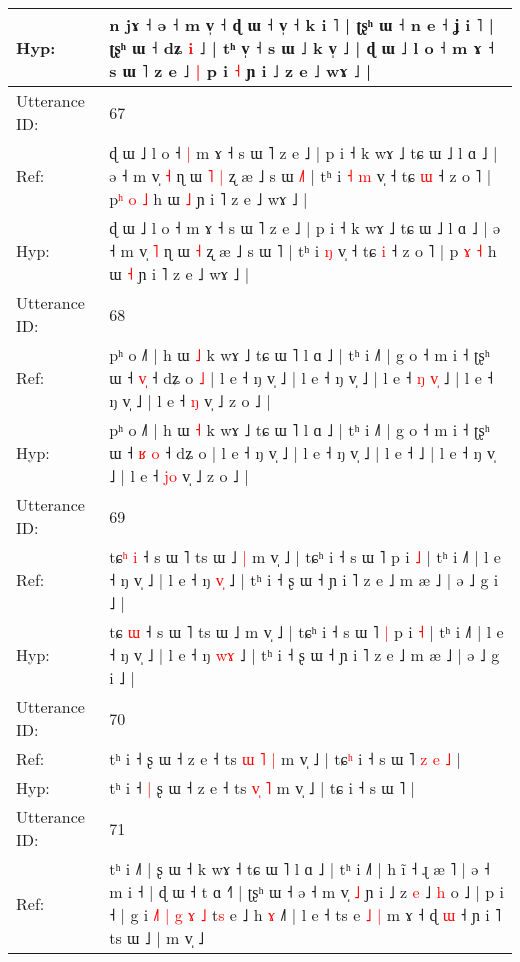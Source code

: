 \documentclass[10pt]{article}
\DeclareRobustCommand{\hl}[1]{{\textcolor{red}{#1}}}
\begin{document}
\begin{longtable}{ll}
 \\
Hyp: & n jɤ ˧\hl{}\hl{} ə ˧ m v̩ ˧\hl{}\hl{}\hl{} ɖ ɯ ˧ v̩ ˧ k i ˥ | ʈʂʰ ɯ ˧ n e ˧ ʝ i ˥ | ʈʂʰ ɯ ˧ dʑ \hl{i} ˩ | tʰ v̩ ˧ s ɯ ˩ k v̩ ˩ | ɖ ɯ ˩ l o ˧\hl{}\hl{} m ɤ ˧ s ɯ ˥ z e ˩\hl{ }\hl{|} p i \hl{˧} ɲ i ˩ z e ˩ wɤ ˩ |
 \\
\midrule
Utterance ID: & 67 \\
Ref: & ɖ ɯ ˩ l o ˧\hl{ }\hl{|} m ɤ ˧ s ɯ ˥ z e ˩ | p i ˧ k wɤ ˩ tɕ ɯ ˩ l ɑ ˩ | ə ˧ m v̩ \hl{˧} ɳ ɯ\hl{ }\hl{˥} \hl{|} ʐ æ ˩ s ɯ \hl{˩}˥ | tʰ i\hl{ }\hl{˧} \hl{m} v̩ ˧ tɕ \hl{ɯ} ˧ z o ˥ | p\hl{ʰ} \hl{o} \hl{˩} h ɯ \hl{˩} ɲ i ˥ z e ˩ wɤ ˩ |
 \\
Hyp: & ɖ ɯ ˩ l o ˧\hl{}\hl{} m ɤ ˧ s ɯ ˥ z e ˩ | p i ˧ k wɤ ˩ tɕ ɯ ˩ l ɑ ˩ | ə ˧ m v̩ \hl{˥} ɳ ɯ\hl{}\hl{} \hl{˧} ʐ æ ˩ s ɯ \hl{}˥ | tʰ i\hl{}\hl{} \hl{ŋ} v̩ ˧ tɕ \hl{i} ˧ z o ˥ | p\hl{} \hl{ɤ} \hl{˧} h ɯ \hl{˧} ɲ i ˥ z e ˩ wɤ ˩ |
 \\
\midrule
Utterance ID: & 68 \\
Ref: & pʰ o ˩˥ | h ɯ \hl{˩} k wɤ ˩ tɕ ɯ ˥ l ɑ ˩ | tʰ i ˩˥ | g o ˧ m i ˧ ʈʂʰ ɯ ˧ \hl{}\hl{v}\hl{̩} ˧ dʑ o\hl{ }\hl{˩} | l e ˧ ŋ v̩ ˩ | l e ˧ ŋ v̩ ˩ | l e ˧\hl{ }\hl{ŋ}\hl{ }\hl{v}\hl{̩} ˩ | l e ˧ ŋ v̩ ˩ | l e ˧ \hl{}\hl{ŋ} v̩ ˩ z o ˩ |
 \\
Hyp: & pʰ o ˩˥ | h ɯ \hl{˧} k wɤ ˩ tɕ ɯ ˥ l ɑ ˩ | tʰ i ˩˥ | g o ˧ m i ˧ ʈʂʰ ɯ ˧ \hl{ʁ}\hl{ }\hl{o} ˧ dʑ o\hl{}\hl{} | l e ˧ ŋ v̩ ˩ | l e ˧ ŋ v̩ ˩ | l e ˧\hl{}\hl{}\hl{}\hl{}\hl{} ˩ | l e ˧ ŋ v̩ ˩ | l e ˧ \hl{j}\hl{o} v̩ ˩ z o ˩ |
 \\
\midrule
Utterance ID: & 69 \\
Ref: & tɕ\hl{ʰ} \hl{i} ˧ s ɯ ˥ ts ɯ ˩\hl{ }\hl{|} m v̩ ˩ | tɕʰ i ˧ s ɯ ˥\hl{}\hl{} p i \hl{˩} | tʰ i ˩˥ | l e ˧ ŋ v̩ ˩ | l e ˧ ŋ \hl{v}\hl{̩} ˩ | tʰ i ˧ ʂ ɯ ˧ ɲ i ˥ z e ˩ m æ ˩ | ə ˩ g i ˩ |
 \\
Hyp: & tɕ\hl{} \hl{ɯ} ˧ s ɯ ˥ ts ɯ ˩\hl{}\hl{} m v̩ ˩ | tɕʰ i ˧ s ɯ ˥\hl{ }\hl{|} p i \hl{˧} | tʰ i ˩˥ | l e ˧ ŋ v̩ ˩ | l e ˧ ŋ \hl{w}\hl{ɤ} ˩ | tʰ i ˧ ʂ ɯ ˧ ɲ i ˥ z e ˩ m æ ˩ | ə ˩ g i ˩ |
 \\
\midrule
Utterance ID: & 70 \\
Ref: & tʰ i ˧\hl{}\hl{} ʂ ɯ ˧ z e ˧ ts \hl{ɯ}\hl{ }\hl{˥} \hl{|} m v̩ ˩ | tɕ\hl{ʰ} i ˧ s ɯ ˥\hl{ }\hl{z}\hl{ }\hl{e}\hl{ }\hl{˩} |
 \\
Hyp: & tʰ i ˧\hl{ }\hl{|} ʂ ɯ ˧ z e ˧ ts \hl{}\hl{v}\hl{̩} \hl{˥} m v̩ ˩ | tɕ\hl{} i ˧ s ɯ ˥\hl{}\hl{}\hl{}\hl{}\hl{}\hl{} |
 \\
\midrule
Utterance ID: & 71 \\
Ref: & tʰ i ˩˥ | ʂ ɯ ˧ k wɤ ˧ tɕ ɯ ˥ l ɑ ˩ | tʰ i ˩˥ | h ĩ ˧ ɻ æ ˥ | ə ˧ m i ˧ | ɖ ɯ ˧ t ɑ ˧˥ | ʈʂʰ ɯ ˧\hl{}\hl{} ə ˧ m v̩ \hl{˩} ɲ i ˩ z \hl{e} ˩ \hl{h} o ˩ | p i ˧ | g i \hl{˩}˥ \hl{|} \hl{g} \hl{ɤ} \hl{˩} t\hl{s} e ˩\hl{}\hl{} h \hl{ɤ} ˩˥ | l e ˧ ts e\hl{ }\hl{˩} \hl{|} m ɤ ˧ ɖ \hl{ɯ} ˧ ɲ i ˥ ts ɯ ˩ | m v̩ ˩\hl{}\hl{}

\end{longtable}
\end{document}

